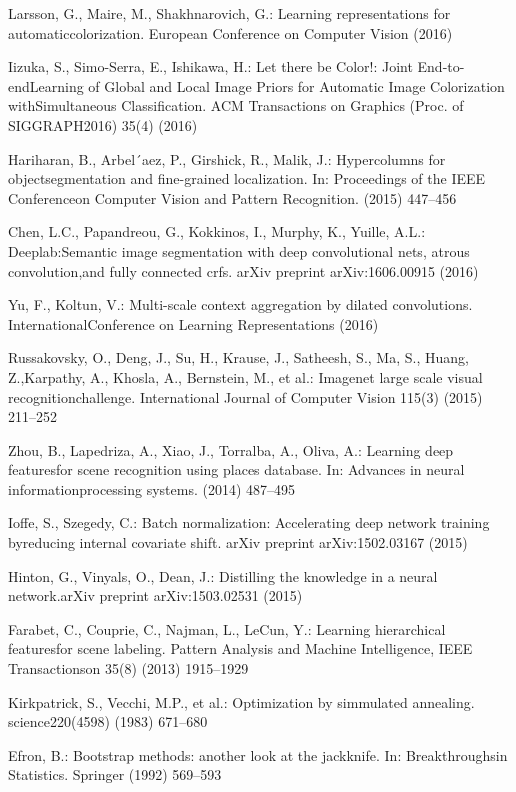 \begin{translationbib}
\item Larsson, G., Maire, M., Shakhnarovich, G.: Learning representations for automaticcolorization. European Conference on Computer Vision (2016)
\item Iizuka, S., Simo-Serra, E., Ishikawa, H.: Let there be Color!: Joint End-to-endLearning of Global and Local Image Priors for Automatic Image Colorization withSimultaneous Classification. ACM Transactions on Graphics (Proc. of SIGGRAPH2016) 35(4) (2016)
\item Hariharan, B., Arbel´aez, P., Girshick, R., Malik, J.: Hypercolumns for objectsegmentation and fine-grained localization. In: Proceedings of the IEEE Conferenceon Computer Vision and Pattern Recognition. (2015) 447–456
\item Chen, L.C., Papandreou, G., Kokkinos, I., Murphy, K., Yuille, A.L.: Deeplab:Semantic image segmentation with deep convolutional nets, atrous convolution,and fully connected crfs. arXiv preprint arXiv:1606.00915 (2016)
\item Yu, F., Koltun, V.: Multi-scale context aggregation by dilated convolutions. InternationalConference on Learning Representations (2016)
\item Russakovsky, O., Deng, J., Su, H., Krause, J., Satheesh, S., Ma, S., Huang, Z.,Karpathy, A., Khosla, A., Bernstein, M., et al.: Imagenet large scale visual recognitionchallenge. International Journal of Computer Vision 115(3) (2015) 211–252
\item Zhou, B., Lapedriza, A., Xiao, J., Torralba, A., Oliva, A.: Learning deep featuresfor scene recognition using places database. In: Advances in neural informationprocessing systems. (2014) 487–495
\item Ioffe, S., Szegedy, C.: Batch normalization: Accelerating deep network training byreducing internal covariate shift. arXiv preprint arXiv:1502.03167 (2015)
\item Hinton, G., Vinyals, O., Dean, J.: Distilling the knowledge in a neural network.arXiv preprint arXiv:1503.02531 (2015)
\item Farabet, C., Couprie, C., Najman, L., LeCun, Y.: Learning hierarchical featuresfor scene labeling. Pattern Analysis and Machine Intelligence, IEEE Transactionson 35(8) (2013) 1915–1929
\item Kirkpatrick, S., Vecchi, M.P., et al.: Optimization by simmulated annealing. science220(4598) (1983) 671–680
\item Efron, B.: Bootstrap methods: another look at the jackknife. In: Breakthroughsin Statistics. Springer (1992) 569–593

\end{translationbib}
